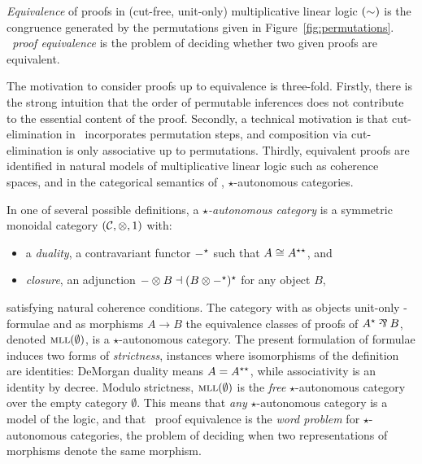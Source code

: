 \begin{definition}
\label{def:equivalence}
%
\emph{Equivalence} of proofs in (cut-free, unit-only) multiplicative linear logic $(\sim)$ is the congruence generated by the permutations given in Figure~\ref{fig:permutations}.
%
\emph{\MLL\ proof equivalence} is the problem of deciding whether two given proofs are equivalent.
%
\end{definition}



The motivation to consider proofs up to equivalence is three-fold.
%
Firstly, there is the strong intuition that the order of permutable inferences does not contribute to the essential content of the proof.
%
Secondly, a technical motivation is that cut-elimination in \MLL\ incorporates permutation steps, and composition via cut-elimination is only associative up to permutations.
%
Thirdly, equivalent proofs are identified in natural models of multiplicative linear logic such as coherence spaces, and in the categorical semantics of \MLL, $\star$-autonomous categories.



In one of several possible definitions, a \emph{$\star$-autonomous category} \citep{Barr-1979} is a symmetric monoidal category $(\mathcal C,\otimes,1)$ with:
%
\begin{itemize}
	
	\item
	a \emph{duality}, a contravariant functor $\dual-$ such that $A\cong\dual*A$, and

	\item
	\emph{closure}, an adjunction $-\tn B \dashv \dual{(B\tn\dual-)}$ for any object $B$,

\end{itemize}
%
satisfying natural coherence conditions.
%
%
The category with as objects unit-only \MLL-formulae and as morphisms $A\to B$ the equivalence classes of proofs of $\dual A\parr B$, denoted $\textsc{mll}(\emptyset)$, is a $\star$-autonomous category.
%
The present formulation of formulae induces two forms of \emph{strictness}, instances where isomorphisms of the definition are identities: DeMorgan duality means $A=\dual*A$, while
associativity is an identity by decree.
%
Modulo strictness, $\textsc{mll}(\emptyset)$ is the \emph{free} $\star$-autonomous category over the empty category $\emptyset$.
%
This means that \emph{any} $\star$-autonomous category is a model of the logic, and that \MLL\ proof equivalence is the \emph{word problem} for $\star$-autonomous categories, the problem of deciding when two representations of morphisms denote the same morphism.




